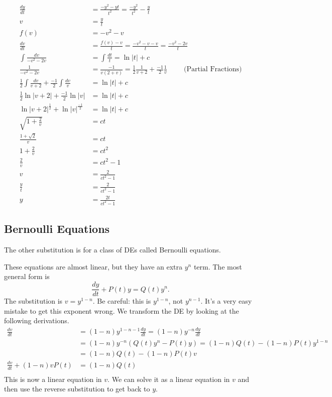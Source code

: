 \documentclass[fleqn,letterpaper]{report}
\begin{document}
\begin{example}
\begin{align*}
\frac{dy}{dt} & = \frac{-y^2 - yt }{t^2} = \frac{-y^2}{t^2} -
\frac{y}{t} \\
v & = \frac{y}{t} \\ 
f(v) & = -v^2 -v \\
\frac{dv}{dt} & = \frac{f(v) - v}{t} = \frac{-v^2 -v -v}{t} =
\frac{-v^2 - 2v}{t} \\
\int \frac{dv}{-v^2-2v} & = \int \frac{dt}{t} = \ln |t| + c \\
\frac{1}{-v^2 - 2v} & = \frac{-1}{v(2+v)} = \frac{1}{2}
\frac{1}{v+2} + \frac{-1}{2} \frac{1}{v} \hspace{1cm}
\text{(Partial Fractions)}\\
\frac{1}{2} \int \frac{dv}{v+2} + \frac{-1}{2} \int \frac{dv}{v}
& = \ln |t| + c \\
\frac{1}{2} \ln |v+2| + \frac{-1}{2} \ln |v| & = \ln |t| + c \\
\ln |v+2|^{\frac{1}{2}} + \ln |v|^\frac{-1}{2} & = \ln |t| + c \\
\sqrt{1 + \frac{2}{v}} & = ct \\
\frac{1 + \sqrt{2}}{v} & = ct \\
1 + \frac{2}{v} & = ct^2 \\
\frac{2}{v} & = ct^2 -1 \\
v & = \frac{2}{ct^2 -1} \\
\frac{y}{t} & = \frac{2}{ct^2 - 1} \\
y & = \frac{2t}{ct^2 -1}
\end{align*}
\end{example}

\subsection{Bernoulli Equations}
\label{bernoulli}

The other substitution is for a class of DEs called Bernoulli
equations.

These equations are almost linear, but they have an extra
$y^n$ term. The most general form is 
\begin{equation*}
\frac{dy}{dt} + P(t) y = Q(t) y^n.
\end{equation*}
The substitution is $v = y^{1-n}$. Be careful: this is
$y^{1-n}$, not $y^{n-1}$. It's a very easy mistake to get
this exponent wrong. We transform the DE by looking at the
following derivations.
\begin{align*}
\frac{dv}{dt} & = (1-n) y^{1-n-1} \frac{dy}{dt} = (1-n)y^{-n}
\frac{dy}{dt} \\
& = (1-n)y^{-n} \left( Q(t) y^n - P(t) y \right) = (1-n) Q(t) -
(1-n) P(t) y^{1-n} \\
&= (1-n) Q(t) - (1-n) P(t) v \\
\frac{dv}{dt} + (1-n)v P(t) & = (1-n) Q(t) \\
\end{align*}
This is now a linear equation in $v$. We can solve it
as a linear equation in $v$ and then use the reverse
substitution to get back to $y$. 
\end{document}
